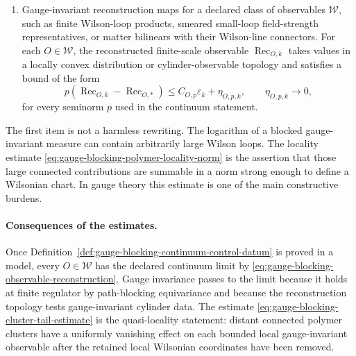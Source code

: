 \begin{definition}
\begin{enumerate}
  be time reflection with orientation reversal on links crossing reflected
  edges.  For every finite list \(F_1,\ldots,F_m\in\mathcal A_{k,+}^{\rm inv}\)
  and coefficients \(c_i\in\C\),
  \begin{equation}
    \sum_{i,j=1}^{m}\bar c_i c_j
    \int \Theta F_i(A)\,F_j(A)\,\dd\mu_k^{\rm blk}(A)
    \geq -\rho_k(F,c),
    \label{eq:gauge-blocking-rp-defect}
  \end{equation}
  with \(\rho_k(F,c)\to0\) for each fixed finite family.  Exact reflection
  positivity is the special case \(\rho_k=0\).
  \item Gauge-invariant reconstruction maps for a declared class of
  observables \(\mathcal W\), such as finite Wilson-loop products, smeared
  small-loop field-strength representatives, or matter bilinears with their
  Wilson-line connectors.  For each \(O\in\mathcal W\), the reconstructed
  finite-scale observable \(\operatorname{Rec}_{O,k}\) takes values in a locally
  convex distribution or cylinder-observable topology and satisfies a
  bound of the form
  \begin{equation}
    p\!\left(\operatorname{Rec}_{O,k}-\operatorname{Rec}_{O,\ast}\right)
    \leq
    C_{O,p}\varepsilon_k+\eta_{O,p,k},
    \qquad
    \eta_{O,p,k}\longrightarrow0 ,
    \label{eq:gauge-blocking-observable-reconstruction}
  \end{equation}
  for every seminorm \(p\) used in the continuum statement.
\end{enumerate}
\end{definition}

The first item is not a harmless rewriting.  The logarithm of a blocked
gauge-invariant measure can contain arbitrarily large Wilson loops.  The
locality estimate \eqref{eq:gauge-blocking-polymer-locality-norm} is the
assertion that those large connected contributions are summable in a norm
strong enough to define a Wilsonian chart.  In gauge theory this estimate is
one of the main constructive burdens.

\paragraph{Consequences of the estimates.}
Once Definition~\ref{def:gauge-blocking-continuum-control-datum} is proved in
a model, every \(O\in\mathcal W\) has the declared continuum limit by
\eqref{eq:gauge-blocking-observable-reconstruction}.  Gauge invariance passes
to the limit because it holds at finite regulator by path-blocking
equivariance and because the reconstruction topology tests gauge-invariant
cylinder data.  The estimate
\eqref{eq:gauge-blocking-cluster-tail-estimate} is the quasi-locality
statement: distant connected polymer clusters have a uniformly vanishing
effect on each bounded local gauge-invariant observable after the retained
local Wilsonian coordinates have been removed.

